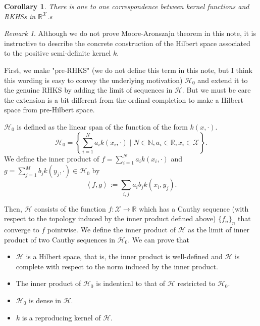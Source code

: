 \documentclass{amsart}
\newtheorem{corollary}[theorem]{Corollary}
\theoremstyle{definition}
\theoremstyle{remark}
\newtheorem{remark}[theorem]{Remark}
\numberwithin{equation}{section}
\begin{document}
\begin{corollary}
There is one to one correspondence between kernel functions and RKHSs in $\mathbb{R}^{\mathcal{X}}$.s
\end{corollary}

\begin{remark}
Although we do not prove Moore-Aronszajn theorem in this note, it is instructive to describe the concrete construction of the Hilbert space associated to the positive semi-definite kernel $k$.

First, we make "pre-RHKS" (we do not define this term in this note, but I think this wording is easy to convey the underlying motivation) $\mathcal{H}_0$ and extend it to the genuine RHKS by adding the limit of sequences in $\mathcal{H}$.
But we must be care the extension is a bit different from the ordinal completion to make a Hilbert space from pre-Hilbert space.

$\mathcal{H_0}$ is defined as the linear span of the function of the form $k(x, \cdot)$. 
\begin{equation}
\mathcal{H}_0 = \left\{\sum_{i=1}^{N} a_i k(x_i, \cdot) \mid N\in \mathbb{N}, a_i \in \mathbb{R}, x_i \in \mathcal{X}\right\}.
\end{equation}
We define the inner product of $f = \sum_{i=1}^{N} a_i k(x_i, \cdot)$ and $g=\sum_{j=1}^{M} b_j k(y_j, \cdot) \in \mathcal{H_0}$ by 
\begin{equation}
\left< f, g\right> := \sum_{i, j} a_i b_j k(x_i, y_j).
\end{equation}

Then, $\mathcal{H}$ consists of the function $f: \mathcal{X}\to \mathbb{R}$ which has a Cauthy sequence (with respect to the topology induced by the inner product defined above) $\{f_n\}_n$ that converge to $f$ pointwise.
We define the inner product of $\mathcal{H}$ as the limit of inner product of two Cauthy sequences in $\mathcal{H}_0$.
We can prove that
\begin{itemize}
\item $\mathcal{H}$ is a Hilbert space, that is, the inner product is well-defined and $\mathcal{H}$ is complete with respect to the norm induced by the inner product.
\item The inner product of $\mathcal{H}_0$ is indentical to that of $\mathcal{H}$ restricted to $\mathcal{H}_0$.
\item $\mathcal{H}_0$ is dense in $\mathcal{H}$.
\item $k$ is a reproducing kernel of $\mathcal{H}$.
\end{itemize}
\end{remark}
\end{document}
